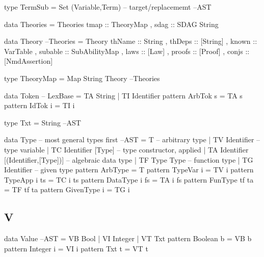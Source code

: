 \begin{code}
type TermSub = Set (Variable,Term) -- target/replacememt                --AST
\end{code}

\begin{code}
data Theories
  = Theories { tmap :: TheoryMap
             , sdag :: SDAG String }
\end{code}

\begin{code}
data Theory                                                         --Theories
  = Theory {
      thName   :: String
    , thDeps   :: [String]
    , known    :: VarTable
    , subable  :: SubAbilityMap
    , laws     :: [Law]
    , proofs   :: [Proof]
    , conjs    :: [NmdAssertion]
    }
\end{code}

\begin{code}
type TheoryMap = Map String Theory                                  --Theories
\end{code}

\begin{code}
data Token                                                         -- LexBase
 = TA String
 | TI Identifier
pattern ArbTok s = TA s
pattern IdTok i = TI i
\end{code}

\begin{code}
type Txt = String                                                        --AST
\end{code}


\begin{code}
data Type -- most general types first                                   --AST
 = T  -- arbitrary type
 | TV Identifier -- type variable
 | TC Identifier [Type] -- type constructor, applied
 | TA Identifier [(Identifier,[Type])] -- algebraic data type
 | TF Type Type -- function type
 | TG Identifier -- given type
pattern ArbType = T
pattern TypeVar i  = TV i
pattern TypeApp i ts = TC i ts
pattern DataType i fs = TA i fs
pattern FunType tf ta = TF tf ta
pattern GivenType i = TG i
\end{code}


\subsection{V}

\begin{code}
data Value                                                               --AST
 = VB Bool
 | VI Integer
 | VT Txt
pattern Boolean b  =  VB b
pattern Integer i  =  VI i
pattern Txt     t  =  VT t
\end{code}

